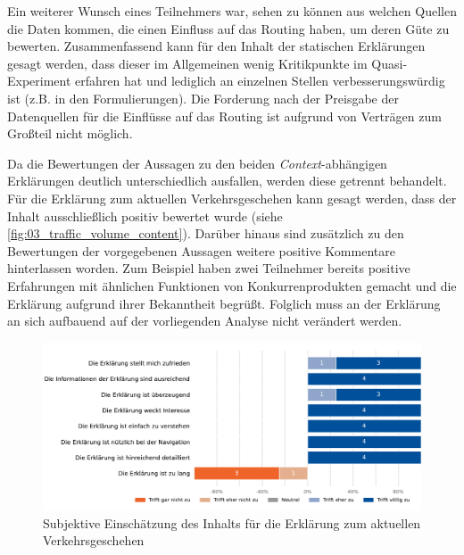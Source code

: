 Ein weiterer Wunsch eines Teilnehmers war, sehen zu können aus welchen Quellen die Daten kommen, die einen Einfluss auf das Routing haben, um deren Güte zu bewerten. Zusammenfassend kann für den Inhalt der statischen Erklärungen gesagt werden, dass dieser im Allgemeinen wenig Kritikpunkte im Quasi-Experiment erfahren hat und lediglich an einzelnen Stellen verbesserungswürdig ist (z.B. in den Formulierungen). Die Forderung nach der Preisgabe der Datenquellen für die Einflüsse auf das Routing ist aufgrund von Verträgen zum Großteil nicht möglich. 

\bigskip

Da die Bewertungen der Aussagen zu den beiden \textit{Context}-abhängigen Erklärungen deutlich unterschiedlich ausfallen, werden diese getrennt behandelt. Für die Erklärung zum aktuellen Verkehrsgeschehen kann gesagt werden, dass der Inhalt ausschließlich positiv bewertet wurde (siehe \autoref{fig:03_traffic_volume_content}). Darüber hinaus sind zusätzlich zu den Bewertungen der vorgegebenen Aussagen weitere positive Kommentare hinterlassen worden. Zum Beispiel haben zwei Teilnehmer bereits positive Erfahrungen mit ähnlichen Funktionen von Konkurrenprodukten gemacht und die Erklärung aufgrund ihrer Bekanntheit begrüßt. Folglich muss an der Erklärung an sich aufbauend auf der vorliegenden Analyse nicht verändert werden.

\begin{figure}[htb!]
    \centering
    \includegraphics[width=\textwidth]{contents/06_model_evaluation/02_evaluation/res/qualitativeFeedback-03_traffic_volume_content.pdf}
    \caption{Subjektive Einschätzung des Inhalts für die Erklärung zum aktuellen Verkehrsgeschehen}
    \label{fig:03_traffic_volume_content}
\end{figure}

\bigskip

